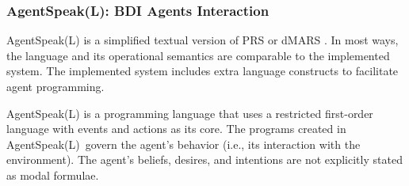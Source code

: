 \vspace{.5cm}

\begin{table}[h]
\small
\centering
\caption{\ac{AOP} versus \ac{OOP}}
\label{AOP versus OOP}
\end{table}

\vspace{.5cm}

\subsubsection{AgentSpeak(L): \ac{BDI} Agents Interaction}

AgentSpeak(L) is a simplified textual version of \ac{PRS} \cite{prs} or \ac{dMARS} \cite{dmars}. In most ways, the language and its operational semantics are comparable to the implemented system. The implemented system includes extra language constructs to facilitate agent programming.

\vspace{.5cm}

AgentSpeak(L) is a programming language that uses a restricted first-order language with events and actions as its core. The programs created in AgentSpeak(L) govern the agent's behavior (i.e., its interaction with the environment). The agent's beliefs, desires, and intentions are not explicitly stated as modal formulae.

\vspace{.5cm}

